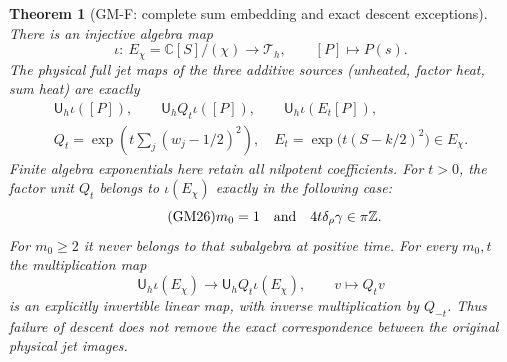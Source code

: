 \documentclass[11pt]{article}
\newtheorem{theorem}{Theorem}
\theoremstyle{remark}\newtheorem{remark}[theorem]{Remark}
\begin{document}
\begin{theorem}[GM-F: complete sum embedding and exact descent exceptions]
There is an injective algebra map
\begin{equation}\tag{GM24}
 \iota:\ E_\chi=\mathbb C[S]/(\chi)\longrightarrow\mathcal T_h,
                 \qquad[P]\longmapsto P(s).
\end{equation}
The physical full jet maps of the three additive sources (unheated,
factor heat, sum heat) are exactly
\begin{equation}\tag{GM25}
 \begin{gathered}
 \mathsf U_h\iota([P]),\qquad
 \mathsf U_h Q_t\iota([P]),\qquad
 \mathsf U_h\iota(E_t[P]),\\
 Q_t=\exp\!\left(t\sum_j(w_j-1/2)^2\right),\quad
 E_t=\exp\bigl(t(S-k/2)^2\bigr)\in E_\chi.
 \end{gathered}
\end{equation}
Finite algebra exponentials here retain all nilpotent coefficients.
For $t>0$, the factor unit $Q_t$ belongs to $\iota(E_\chi)$ exactly
in the following case:
\begin{equation}\tag{GM26}
 m_0=1\quad\hbox{and}\quad4t\delta_\rho\gamma\in\pi\mathbb Z.
\end{equation}
For $m_0\geq2$ it never belongs to that subalgebra at positive time.
For every $m_0,t$ the multiplication map
\begin{equation}\tag{GM27}
 \mathsf U_h\iota(E_\chi)\longrightarrow
                  \mathsf U_h Q_t\iota(E_\chi),\qquad v\longmapsto Q_tv
\end{equation}
is an explicitly invertible linear map, with inverse multiplication
by $Q_{-t}$.  Thus failure of descent does not remove the exact
correspondence between the original physical jet images.
\end{theorem}
\end{document}
